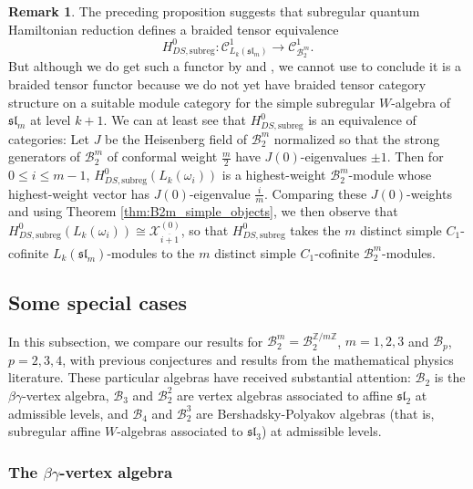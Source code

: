\documentclass[11pt, reqno]{amsart}
\theoremstyle{definition}\newtheorem{defi}[thm]{Definition}
\theoremstyle{definition}\newtheorem{rem}[thm]{Remark}
\theoremstyle{definition}\newtheorem{exam}[thm]{Example}
\theoremstyle{definition}\newtheorem{assum}[thm]{Assumption}
\newcommand{\cB}{\mathcal{B}}
\newcommand{\cX}{\mathcal{X}}
\newcommand{\cC}{\mathcal{C}}
\newcommand{\ZZ}{\mathbb{Z}}
\begin{document}
\begin{rem}\label{rem:qHr_braided_tensor}
The preceding proposition suggests that subregular quantum Hamiltonian reduction defines a braided tensor equivalence 
\begin{equation*}
H^0_{DS,\text{subreg}}: \cC^1_{L_k(\mathfrak{sl}_m)}\longrightarrow\cC^1_{\cB_2^m}.
\end{equation*}
But although we do get such a functor by \cite[Lemma 3.1.6]{Ar-assoc-var} and \cite[Corollary 4.5.10]{Ar-C2}, we cannot use \cite[Theorem 10.4]{ACF} to conclude it is a braided tensor functor because we do not yet have braided tensor category structure on a suitable module category for the simple subregular $W$-algebra of $\mathfrak{sl}_m$ at level $k+1$. We can at least see that $H^0_{DS,\text{subreg}}$ is an equivalence of categories: Let $J$ be the Heisenberg field of $\cB_2^m$ normalized so that the strong generators of $\cB_2^m$ of conformal weight $\frac{m}{2}$ have $J(0)$-eigenvalues $\pm 1$. 
 Then for $0\leq i\leq m-1$, $H^0_{DS,\text{subreg}}(L_{k}( \omega_i))$ is a highest-weight $\cB_2^m$-module whose highest-weight vector has $J(0)$-eigenvalue $\frac{i}{m}$. Comparing these $J(0)$-weights and using Theorem \ref{thm:B2m_simple_objects}, we then observe that 
 $H^0_{DS,\text{subreg}}(L_{k}( \omega_i)) \cong \cX_{\overline{i+1}}^{(0)}$, so that $H^0_{DS,\text{subreg}}$ takes the $m$ distinct simple $C_1$-cofinite $L_k(\mathfrak{sl}_m)$-modules to the $m$ distinct simple $C_1$-cofinite $\cB_2^m$-modules.
\end{rem}


\subsection{Some special cases}\label{subsec:special_cases}

In this subsection, we compare our results for $\cB_2^m=\cB_2^{\ZZ/m\ZZ}$, $m=1,2,3$ and $\cB_p$, $p=2,3,4$, with previous conjectures and results from the mathematical physics literature. These particular algebras have received substantial attention: $\cB_2$ is the $\beta\gamma$-vertex algebra, $\cB_3$ and $\cB_2^{2}$ are vertex algebras associated to affine $\mathfrak{sl}_2$ at admissible levels, and $\cB_4$ and $\cB_2^{3}$ are Bershadsky-Polyakov algebras (that is, subregular affine $W$-algebras associated to $\mathfrak{sl}_3$) at admissible levels.

\subsubsection{The \texorpdfstring{$\beta\gamma$}{beta-gamma}-vertex algebra}
\end{document}
